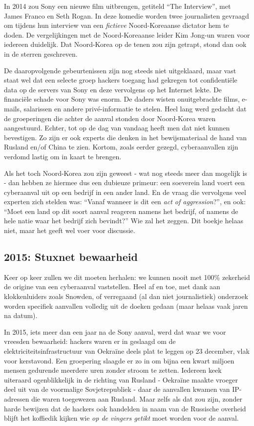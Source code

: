 \documentclass[
  10pt,
  dutch,
  paper=a4,
  ,captions=tableheading
]{scrbook}
\begin{document}
In 2014 zou Sony een nieuwe film uitbrengen, getiteld ``The Interview'',
met James Franco en Seth Rogan. In deze komedie worden twee journalisten
gevraagd om tijdens hun interview van een \emph{fictieve}
Noord-Koreaanse dictator hem te doden. De vergelijkingen met de
Noord-Koreaanse leider Kim Jong-un waren voor iedereen duidelijk. Dat
Noord-Korea op de tenen zou zijn getrapt, stond dan ook in de sterren
geschreven.

De daaropvolgende gebeurtenissen zijn nog steeds niet uitgeklaard, maar
vast staat wel dat een selecte groep hackers toegang had gekregen tot
confidentiële data op de servers van Sony en deze vervolgens op het
Internet lekte. De financiële schade voor Sony was enorm. De daders
wisten onuitgebrachte films, e-mails, salarissen en andere
privé-informatie te stelen. Heel lang werd gedacht dat de groeperingen
die achter de aanval stonden door Noord-Korea waren aangestuurd. Echter,
tot op de dag van vandaag heeft men dat niet kunnen bevestigen. Zo zijn
er ook experts die denken in het bewijsmateriaal de hand van Rusland
en/of China te zien. Kortom, zoals eerder gezegd, cyberaanvallen zijn
verdomd lastig om in kaart te brengen.

Als het toch Noord-Korea zou zijn geweest - wat nog steeds meer dan
mogelijk is - dan hebben ze hiermee dus een dubieuze primeur: een
soeverein land voert een cyberaanval uit op een bedrijf in een ander
land. En de vraag die vervolgens veel experten zich stelden was: ``Vanaf
wanneer is dit een \emph{act of aggression}?'', en ook: ``Moet een land
op dit soort aanval reageren namens het bedrijf, of namens de hele natie
waar het bedrijf zich bevindt?'' Wie zal het zeggen. Dit boekje helaas
niet, maar het geeft wel voer voor discussie.

\subsection{2015: Stuxnet bewaarheid}\label{stuxnet-bewaarheid}

Keer op keer zullen we dit moeten herhalen: we kunnen nooit met 100\%
zekerheid de origine van een cyberaanval vaststellen. Heel af en toe,
met dank aan klokkenluiders zoals Snowden, of verregaand (al dan niet
journalistiek) onderzoek worden specifiek aanvallen volledig uit de
doeken gedaan (maar helaas vaak jaren na datum).

In 2015, iets meer dan een jaar na de Sony aanval, werd dat waar we voor
vreesden bewaarheid: hackers waren er in geslaagd om de
elektriciteitsinfrastructuur van Oekraïne deels plat te leggen op 23
december, vlak voor kerstavond. Een groepering slaagde er zo in om bijna
een kwart miljoen mensen gedurende meerdere uren zonder stroom te
zetten. Iedereen keek uiteraard ogenblikkelijk in de richting van
Rusland - Oekraïne maakte vroeger deel uit van de voormalige
Sovjetrepubliek - daar de aanvallen kwamen van IP-adressen die waren
toegewezen aan Rusland. Maar zelfs als dat zou zijn, zonder harde
bewijzen dat de hackers ook handelden in naam van de Russische overheid
blijft het koffiedik kijken wie \emph{op de vingers getikt} moet worden
voor de aanval.
\end{document}
